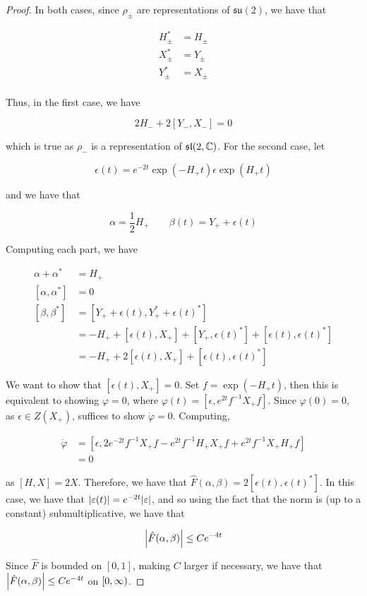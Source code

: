 \documentclass{report}
\newcommand{\su}{\mathfrak{su}}
\renewcommand{\sl}{\mathfrak{sl}}
\begin{document}
\begin{proof}
    In both cases, since \(\rho_{\pm}\) are representations of \(\su(2)\), we have that

    \begin{align*}
        H_{\pm}^* &= H_{\pm} \\
        X_{\pm}^* &= Y_{\pm} \\
        Y_{\pm}^* &= X_{\pm} \\
    \end{align*}

    Thus, in the first case, we have

    \[2H_- + 2[Y_-, X_-] = 0\]

    which is true as \(\rho_-\) is a representation of \(\sl(2, \C)\). For the second case, let

    \[\epsilon(t) = e^{-2t}\exp(-H_+t)\epsilon\exp(H_+t)\]

    and we have that

    \[\alpha = \frac12H_+ \qquad \beta(t) = Y_+ + \epsilon(t)\]

    Computing each part, we have

    \begin{align*}
        \alpha + \alpha^* &= H_+ \\
        [\alpha, \alpha^*] &= 0 \\
        [\beta, \beta^*] &= [Y_+ + \epsilon(t), Y_+^* + \epsilon(t)^*] \\
        &= -H_+ + [\epsilon(t), X_+] + [Y_+, \epsilon(t)^*] + [\epsilon(t), \epsilon(t)^*] \\
        &= -H_+ + 2[\epsilon(t), X_+] + [\epsilon(t), \epsilon(t)^*]
    \end{align*}

    We want to show that \([\epsilon(t), X_+] = 0\). Set \(f = \exp(-H_+t)\), then this is equivalent to showing \(\varphi = 0\), where \(\varphi(t) = [\epsilon, e^{2t}f^{-1}X_+ f]\). Since \(\varphi(0) = 0\), as \(\epsilon \in Z(X_+)\), suffices to show \(\dot\varphi = 0\). Computing,

    \begin{align*}
        \dot\varphi &= [\epsilon, 2e^{-2t}f^{-1}X_+ f - e^{2t}f^{-1}H_+X_+ f + e^{2t}f^{-1}X_+ H_+f] \\
        &= 0
    \end{align*}

    as \([H, X] = 2X\). Therefore, we have that \(\hat F(\alpha, \beta) = 2[\epsilon(t), \epsilon(t)^*]\). In this case, we have that \(\abs{\varepsilon(t)} = e^{-2t}\abs{\varepsilon}\), and so using the fact that the norm is (up to a constant) submultiplicative, we have that

    \[\abs{\hat F(\alpha, \beta)} \le Ce^{-4t}\]

    Since \(\hat F\) is bounded on \([0, 1]\), making \(C\) larger if necessary, we have that \(\abs{\hat F(\alpha, \beta)} \le Ce^{-4t}\) on \([0, \infty)\). 
\end{proof}
\end{document}
